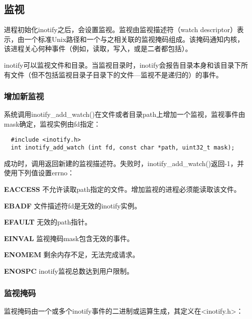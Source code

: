 \subsection{监视}

进程初始化inotify之后，会设置监视。监视由监视描述符（watch descriptor）表示，由一个标准Unix路径和一个与之相关联的监视掩码组成。该掩码通知内核，该进程关心何种事件（例如，读取，写入，或是二者都包括）。

inotify可以监视文件和目录。当监视目录时，inotify会报告目录本身和该目录下所有文件（但不包括监视目录子目录下的文件—监视不是递归的）的事件。

\subsubsection{增加新监视}

系统调用inotify\_add\_watch()在文件或者目录path上增加一个监视，监视事件由mask确定，监视实例由fd指定：

\begin{lstlisting}
  #include <inotify.h>
  int inotify_add_watch (int fd, const char *path, uint32_t mask);
\end{lstlisting}

成功时，调用返回新建的监视描述符。失败时，inotify\_add\_watch()返回-1，并使用下列值设置errno：

\begin{eqlist*}
\item[\textbf{EACCESS}] 不允许读取path指定的文件。增加监视的进程必须能读取该文件。
\item[\textbf{EBADF}] 文件描述符fd是无效的inotify实例。
\item[\textbf{EFAULT}] 无效的path指针。
\item[\textbf{EINVAL}] 监视掩码mask包含无效的事件。
\item[\textbf{ENOMEM}] 剩余内存不足，无法完成请求。
\item[\textbf{ENOSPC}] inotify监视总数达到用户限制。
\end{eqlist*}

\subsubsection{监视掩码}

监视掩码由一个或多个inotify事件的二进制或运算生成，其定义在<inotify.h>：

